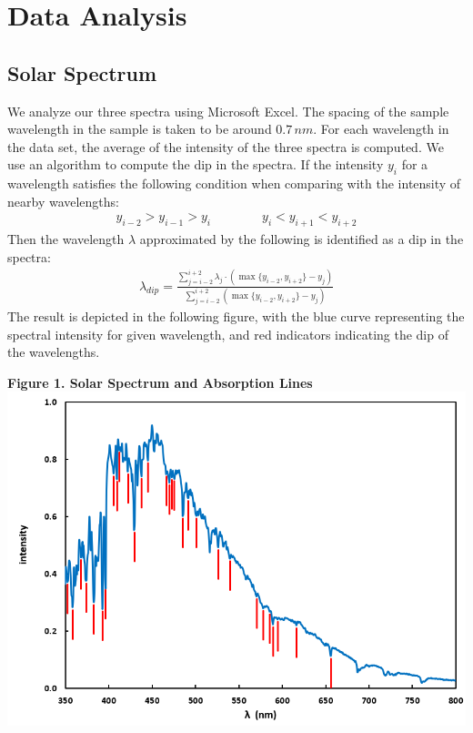 \documentclass[11pt]{book}
\theoremstyle{break}
\theoremstyle{break}
\begin{document}
\section{Data Analysis}
\subsection{Solar Spectrum}
We analyze our three spectra using Microsoft Excel. The spacing of the sample wavelength in the sample is taken to be around $0.7\, nm$. For each wavelength in the data set, the average of the intensity of the three spectra is computed. We use an algorithm to compute the dip in the spectra. If the intensity $y_i$ for a wavelength satisfies the following condition when comparing with the intensity of nearby wavelengths:
\begin{align}
y_{i-2} > y_{i-1} > y_i \qquad\qquad y_i<y_{i+1} < y_{i+2}
\end{align}
Then the wavelength $\lambda$ approximated by the following is identified as a dip in the spectra:
\begin{align*}
\lambda_{dip} = \frac{\sum_{j=i-2}^{i+2}\lambda_j \cdot (\max\{y_{i-2}, y_{i+2}\}-y_j)}{\sum_{j=i-2}^{i+2}(\max\{y_{i-2},y_{i+2}\}-y_j)}
\end{align*}
The result is depicted in the following figure, with the blue curve representing the spectral intensity for given wavelength, and red indicators indicating the dip of the wavelengths.\\
\begin{center}
\textbf{Figure 1. Solar Spectrum and Absorption Lines}\\
\includegraphics[scale=0.8]{spectral}
\end{center}
\end{document}
